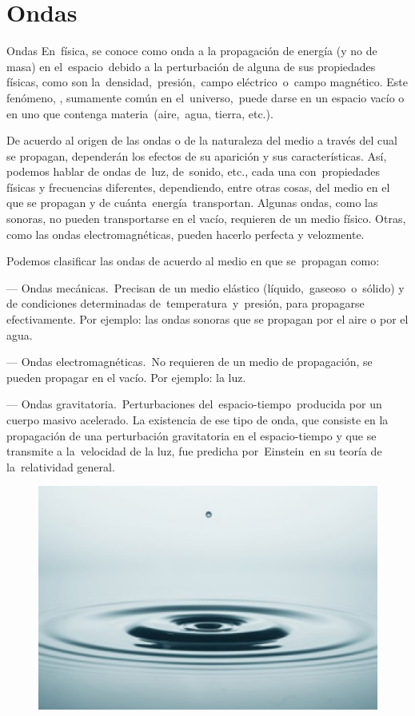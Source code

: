 \part{Ondas}


\begin{myalertblock}{Ondas}
En física, se conoce como onda a la propagación de energía (y no de masa) en el espacio debido a la perturbación de alguna de sus propiedades físicas, como son la densidad, presión, campo eléctrico o campo magnético. Este fenómeno, , sumamente común en el universo, puede darse en un espacio vacío o en uno que contenga materia (aire, agua, tierra, etc.).

\vspace{2mm} De acuerdo al origen de las ondas o de la naturaleza del medio a través del cual se propagan, dependerán los efectos de su aparición y sus características. Así, podemos hablar de ondas de luz, de sonido, etc., cada una con propiedades físicas y frecuencias diferentes, dependiendo, entre otras cosas, del medio en el que se propagan y de cuánta energía transportan.
Algunas ondas, como las sonoras, no pueden transportarse en el vacío, requieren de un medio físico. Otras, como las ondas electromagnéticas, pueden hacerlo perfecta y velozmente.

\vspace{2mm} Podemos clasificar las ondas de acuerdo al medio en que se propagan como:

--- Ondas mecánicas. Precisan de un medio elástico (líquido, gaseoso o sólido) y de condiciones determinadas de temperatura y presión, para propagarse efectivamente. Por ejemplo: las ondas sonoras que se propagan por el aire o por el agua.

--- Ondas electromagnéticas. No requieren de un medio de propagación,  se pueden propagar en el vacío. Por ejemplo: la luz.

--- Ondas gravitatoria. Perturbaciones del espacio-tiempo producida por un cuerpo masivo acelerado. La existencia de ese tipo de onda, que consiste en la propagación de una perturbación gravitatoria en el espacio-tiempo y que se transmite a la velocidad de la luz, fue predicha por Einstein en su teoría de la relatividad general.

\begin{figure}[H]
		\centering
		\includegraphics[width=1\textwidth]{imagenes/imagenes19/T19IM01.png}
	\end{figure}


\end{myalertblock}
